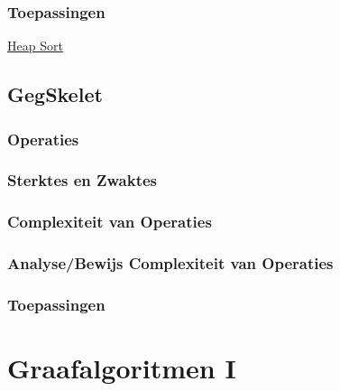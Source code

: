 \documentclass{article}
\begin{document}
\subsubsection{Toepassingen} %
\label{sub:heaps_toepassingen}
\hyperref[sub:heap_sort]{Heap Sort}



\subsection{GegSkelet} %
\label{sub:gegskelet}
\subsubsection{Operaties} %
\label{sub:operaties}


\subsubsection{Sterktes en Zwaktes} %
\label{sub:sterktes_en_zwaktes}


\subsubsection{Complexiteit van Operaties} %
\label{sub:complexiteit_van_operaties}


\subsubsection{Analyse/Bewijs Complexiteit van Operaties} %
\label{sub:analyse_bewijs_complexiteit_van_operaties}


\subsubsection{Toepassingen} %
\label{sub:toepassingen}

\newpage

\section{Graafalgoritmen I\label{graafI}}
\end{document}
